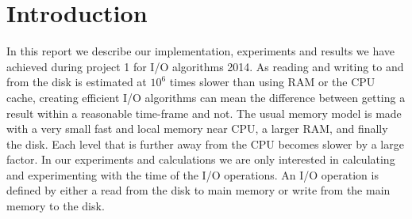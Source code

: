 \section{Introduction}

In this report we describe our implementation, experiments and results we have achieved during project 1 for I/O algorithms 2014.
As reading and writing to and from the disk is estimated at ${10^{6}}$ times slower than using RAM or the CPU cache, creating efficient I/O algorithms can mean the difference between getting a result within a reasonable time-frame and not. 
The usual memory model is made with a very small fast and local memory near CPU, a larger RAM, and finally the disk. Each level that is further away from the CPU becomes slower by a large factor. In our experiments and calculations we are only interested in calculating and experimenting with the time of the I/O operations. An I/O operation is defined by either a read from the disk to main memory or write from the main memory to the disk.


